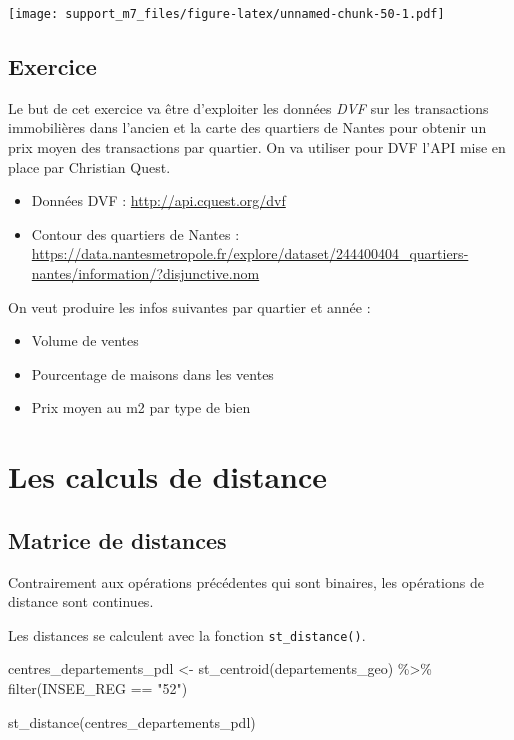\documentclass[
]{book}
\newenvironment{Shaded}{\begin{snugshade}}{\end{snugshade}}
\newcommand{\FunctionTok}[1]{\textcolor[rgb]{0.00,0.00,0.00}{#1}}
\newcommand{\NormalTok}[1]{#1}
\newcommand{\OtherTok}[1]{\textcolor[rgb]{0.56,0.35,0.01}{#1}}
\newcommand{\SpecialCharTok}[1]{\textcolor[rgb]{0.00,0.00,0.00}{#1}}
\newcommand{\StringTok}[1]{\textcolor[rgb]{0.31,0.60,0.02}{#1}}
\providecommand{\tightlist}{%
  \setlength{\itemsep}{0pt}\setlength{\parskip}{0pt}}
\begin{document}
\texttt{[image: support\_m7\_files/figure-latex/unnamed-chunk-50-1.pdf]}

\hypertarget{exercice}{%
\subsection{Exercice}\label{exercice}}

Le but de cet exercice va être d'exploiter les données \emph{DVF} sur les transactions immobilières dans l'ancien et la carte des quartiers de Nantes pour obtenir un prix moyen des transactions par quartier.
On va utiliser pour DVF l'API mise en place par Christian Quest.

\begin{itemize}
\item
  Données DVF : \url{http://api.cquest.org/dvf}
\item
  Contour des quartiers de Nantes : \url{https://data.nantesmetropole.fr/explore/dataset/244400404_quartiers-nantes/information/?disjunctive.nom}
\end{itemize}

On veut produire les infos suivantes par quartier et année :

\begin{itemize}
\tightlist
\item
  Volume de ventes
\item
  Pourcentage de maisons dans les ventes
\item
  Prix moyen au m2 par type de bien
\end{itemize}

\hypertarget{les-calculs-de-distance}{%
\section{Les calculs de distance}\label{les-calculs-de-distance}}

\hypertarget{matrice-de-distances}{%
\subsection{Matrice de distances}\label{matrice-de-distances}}

Contrairement aux opérations précédentes qui sont binaires, les opérations de distance sont continues.

Les distances se calculent avec la fonction \texttt{st\_distance()}.

\begin{Shaded}
\begin{Highlighting}[]
\NormalTok{centres\_departements\_pdl }\OtherTok{\textless{}{-}} \FunctionTok{st\_centroid}\NormalTok{(departements\_geo) }\SpecialCharTok{\%\textgreater{}\%}
  \FunctionTok{filter}\NormalTok{(INSEE\_REG }\SpecialCharTok{==} \StringTok{"52"}\NormalTok{)}

\FunctionTok{st\_distance}\NormalTok{(centres\_departements\_pdl)}
\end{Highlighting}
\end{Shaded}
\end{document}
